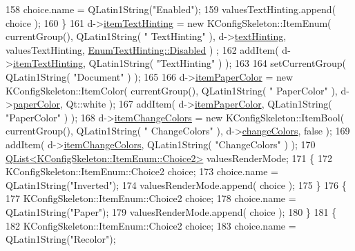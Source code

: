 \begin{DoxyCode}
158     choice.name = QLatin1String(\textcolor{stringliteral}{"Enabled"});
159     valuesTextHinting.append( choice );
160   \}
161   d->\hyperlink{classOkular_1_1SettingsCorePrivate_ac0923ea9d0acc5f0abe431ed0f4fca98}{itemTextHinting} = \textcolor{keyword}{new} KConfigSkeleton::ItemEnum( currentGroup(), QLatin1String( \textcolor{stringliteral}{"
      TextHinting"} ), d->\hyperlink{classOkular_1_1SettingsCorePrivate_a8492490de6581f4d098f56482f943c5e}{textHinting}, valuesTextHinting, \hyperlink{classOkular_1_1SettingsCore_1_1EnumTextHinting_a8b32766d39fec9699e5133223463450fa7e7c27a245665e157178bd7a2ad96743}{EnumTextHinting::Disabled} )
      ;
162   addItem( d->\hyperlink{classOkular_1_1SettingsCorePrivate_ac0923ea9d0acc5f0abe431ed0f4fca98}{itemTextHinting}, QLatin1String( \textcolor{stringliteral}{"TextHinting"} ) );
163 
164   setCurrentGroup( QLatin1String( \textcolor{stringliteral}{"Document"} ) );
165 
166   d->\hyperlink{classOkular_1_1SettingsCorePrivate_a7c87e39720150455f90a96214e2cca2b}{itemPaperColor} = \textcolor{keyword}{new} KConfigSkeleton::ItemColor( currentGroup(), QLatin1String( \textcolor{stringliteral}{"
      PaperColor"} ), d->\hyperlink{classOkular_1_1SettingsCorePrivate_ad7b5c7af2f0c3beb1de8ffa6eb419d55}{paperColor}, Qt::white );
167   addItem( d->\hyperlink{classOkular_1_1SettingsCorePrivate_a7c87e39720150455f90a96214e2cca2b}{itemPaperColor}, QLatin1String( \textcolor{stringliteral}{"PaperColor"} ) );
168   d->\hyperlink{classOkular_1_1SettingsCorePrivate_a5254075bc2d138a58c2eb25811e18e23}{itemChangeColors} = \textcolor{keyword}{new} KConfigSkeleton::ItemBool( currentGroup(), QLatin1String( \textcolor{stringliteral}{"
      ChangeColors"} ), d->\hyperlink{classOkular_1_1SettingsCorePrivate_a779525d859d75bf8d158edfe7b59bd41}{changeColors}, \textcolor{keyword}{false} );
169   addItem( d->\hyperlink{classOkular_1_1SettingsCorePrivate_a5254075bc2d138a58c2eb25811e18e23}{itemChangeColors}, QLatin1String( \textcolor{stringliteral}{"ChangeColors"} ) );
170   \hyperlink{classQList}{QList<KConfigSkeleton::ItemEnum::Choice2>} valuesRenderMode;
171   \{
172     KConfigSkeleton::ItemEnum::Choice2 choice;
173     choice.name = QLatin1String(\textcolor{stringliteral}{"Inverted"});
174     valuesRenderMode.append( choice );
175   \}
176   \{
177     KConfigSkeleton::ItemEnum::Choice2 choice;
178     choice.name = QLatin1String(\textcolor{stringliteral}{"Paper"});
179     valuesRenderMode.append( choice );
180   \}
181   \{
182     KConfigSkeleton::ItemEnum::Choice2 choice;
183     choice.name = QLatin1String(\textcolor{stringliteral}{"Recolor"});

\end{DoxyCode}
